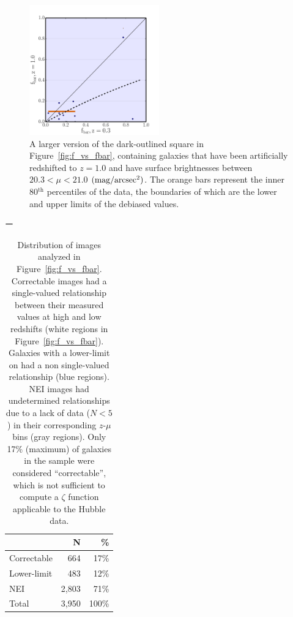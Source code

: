 \documentclass[twocolumn]{aastex6}
\begin{document}
\begin{figure}
\centering
\includegraphics[width=0.5\textwidth]{figures/z1_mu20_subplot2_bar.pdf}
\caption{A larger version of the dark-outlined square in Figure~\ref{fig:f_vs_fbar}, containing
\ferengi{} galaxies that have been artificially redshifted to $z=1.0$ and have
surface brightnesses between $20.3 < \mu < 21.0$ $\rm (mag/arcsec^2)$. The orange bars represent the inner
80$^\mathrm{th}$ percentiles of the data, the boundaries of which are the lower
and upper limits of the debiased values.}
\label{fig:f_vs_fbar_zoom}
\end{figure}

\begin{table}ー
\label{tbl:ferengi_bar}
\caption{Distribution of \ferengi{} images analyzed in
Figure~\ref{fig:f_vs_fbar}. Correctable images had a single-valued relationship
between their measured \fbar{} values at high and low redshifts (white regions
in Figure~\ref{fig:f_vs_fbar}). Galaxies with a lower-limit on \fbar{} had a
non single-valued relationship (blue regions). NEI images had undetermined
relationships due to a lack of data ($N<5$) in their corresponding $z$-$\mu$
bins (gray regions). Only 17\% (maximum) of \ferengi{} galaxies in the sample
were considered ``correctable'', which is not sufficient to compute a $\zeta$
function applicable to the Hubble data.   \label{tbl:ferengi_bar_corrections}}
\begin{tabular}{lrr}
\hline \hline
				                   & N       & \% \\
\hline 
Correctable                        & 664   & 17\% \\
Lower-limit                        & 483   & 12\% \\
NEI                                & 2,803     & 71\%\\
Total                              & 3,950   & 100\% \\
\hline \hline
\end{tabular}
\end{table}
\end{document}

